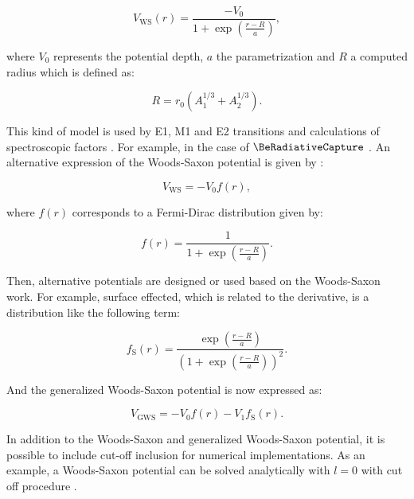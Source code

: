 \documentclass[openany]{book}
\begin{document}
\begin{equation} \label{eq:potential_WoodsSaxon}
	V_{\mathrm{WS}}(r) = \frac{-V_0}{1 + \exp  \left({\frac{r-R}{a}}\right)},
\end{equation}

where $V_0$ represents the potential depth, $a$ the parametrization and $R$ a computed radius which is defined as: 

\begin{equation} \label{eq:potential_WoodsSaxon_radius}
	R = r_0(A_1^{1/3} + A_2^{1/3}).
\end{equation}

This kind of model is used by E1, M1 and E2 transitions and calculations of spectroscopic factors  \cite{bertulani_1996}. For example, in the case of $\BeRadiativeCapture$ \cite{kabir_nabi_2021}. An alternative expression of the Woods-Saxon potential is given by \cite{salamon_baran_vertse_2016}:

\begin{equation} \label{eq:potential_WoodsSaxon2}
	V_{\mathrm{WS}} = -V_0 f(r),
\end{equation}

where $f(r)$ corresponds to a Fermi-Dirac distribution given by:

\begin{equation}  \label{eq:potential_WoodsSaxon2_fermiDirac}
	f(r) = \frac{1}{1 + \exp {\left(\frac{r- R}{a}\right)}}.
\end{equation}

Then, alternative potentials are designed or used based on the Woods-Saxon work. For example, surface effected, which is related to the derivative, is a distribution like the following term: 

\begin{equation}  \label{eq:potential_WoodsSaxon2_surfaceFermiDirac}
	f_{\mathrm{S}}(r) = \frac{\exp{\left(\frac{r - R}{a}\right)}}{\left(1 + \exp {\left(\frac{r- R}{a}\right)}\right)^2}.
\end{equation}

And the generalized Woods-Saxon potential is now expressed as: 

\begin{equation} \label{eq:potential_GeneralWoodsSaxon}
	V_{\mathrm{GWS}} = -V_0 f(r) - V_1 	f_{\mathrm{S}}(r).
\end{equation}

In addition to the Woods-Saxon and generalized Woods-Saxon potential, it is possible to include cut-off inclusion for numerical implementations. As an example, a Woods-Saxon potential can be solved analytically with $l = 0$ with cut off procedure \cite{salamon_baran_vertse_2016}. \\
\end{document}
